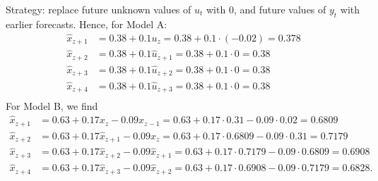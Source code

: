 \documentclass[11pt,a4paper]{article}
\begin{document}
\begin{itemize}
\begin{itemize}
Strategy: replace future unknown values of $u_t$ with 0, and future values of $y_t$ with earlier forecasts. 
Hence, for Model A:
\begin{align*}
\hat{x}_{z+1} &= 0.38 + 0.1 u_z = 0.38 + 0.1 \cdot(-0.02) = 0.378\\
\hat{x}_{z+2} &= 0.38 + 0.1 \hat u_{z+1} = 0.38 + 0.1 \cdot 0 = 0.38\\
\hat{x}_{z+3} &= 0.38 + 0.1 \hat u_{z+2} = 0.38 + 0.1 \cdot 0 = 0.38\\
\hat{x}_{z+4} &= 0.38 + 0.1 \hat u_{z+3} = 0.38 + 0.1 \cdot 0 = 0.38\\
\end{align*}
For Model B, we find
\begin{align*}
\hat{x}_{z+1} &= 0.63 + 0.17 x_{z} -0.09 x_{z-1} =  0.63 + 0.17 \cdot 0.31 -0.09 \cdot 0.02 = 0.6809\\
\hat{x}_{z+2} &= 0.63 + 0.17 \hat x_{z+1} -0.09 x_{z} = 0.63 + 0.17 \cdot  0.6809 -0.09 \cdot 0.31 = 0.7179\\
\hat{x}_{z+3} &= 0.63 + 0.17 \hat x_{z+2} -0.09 \hat x_{z+1} = 0.63 + 0.17 \cdot 0.7179 -0.09 \cdot 0.6809 = 0.6908\\
\hat{x}_{z+4} &= 0.63 + 0.17 \hat x_{z+3} -0.09 \hat x_{z+2} = 0.63 + 0.17 \cdot 0.6908 -0.09 \cdot 0.7179 = 0.6828.
\end{align*}


\end{itemize}
\end{itemize}
\end{document}
